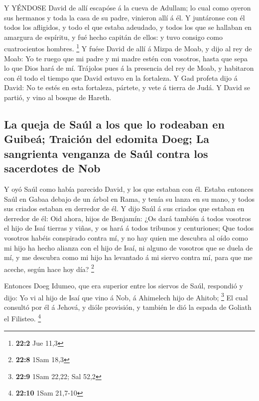  Y YÉNDOSE David de allí escapóse á la cueva de Adullam; lo
cual como oyeron sus hermanos y toda la casa de su padre, vinieron allí
á él.  Y juntáronse con él todos los afligidos, y todo el
que estaba adeudado, y todos los que se hallaban en amargura de
espíritu, y fué hecho capitán de ellos: y tuvo consigo como
cuatrocientos hombres. \footnote{\textbf{22:2} Jue 11,3}  Y
fuése David de allí á Mizpa de Moab, y dijo al rey de Moab: Yo te ruego
que mi padre y mi madre estén con vosotros, hasta que sepa lo que Dios
hará de mí.  Trájolos pues á la presencia del rey de Moab, y
habitaron con él todo el tiempo que David estuvo en la fortaleza.
 Y Gad profeta dijo á David: No te estés en esta fortaleza,
pártete, y vete á tierra de Judá. Y David se partió, y vino al bosque de
Hareth.

\hypertarget{la-queja-de-sauxfal-a-los-que-lo-rodeaban-en-guibeuxe1-traiciuxf3n-del-edomita-doeg-la-sangrienta-venganza-de-sauxfal-contra-los-sacerdotes-de-nob}{%
\subsection{La queja de Saúl a los que lo rodeaban en Guibeá; Traición
del edomita Doeg; La sangrienta venganza de Saúl contra los sacerdotes
de
Nob}\label{la-queja-de-sauxfal-a-los-que-lo-rodeaban-en-guibeuxe1-traiciuxf3n-del-edomita-doeg-la-sangrienta-venganza-de-sauxfal-contra-los-sacerdotes-de-nob}}

 Y oyó Saúl como había parecido David, y los que estaban con
él. Estaba entonces Saúl en Gabaa debajo de un árbol en Rama, y tenía su
lanza en su mano, y todos sus criados estaban en derredor de él.
 Y dijo Saúl á sus criados que estaban en derredor de él:
Oid ahora, hijos de Benjamín: ¿Os dará también á todos vosotros el hijo
de Isaí tierras y viñas, y os hará á todos tribunos y centuriones;
 Que todos vosotros habéis conspirado contra mí, y no hay
quien me descubra al oído como mi hijo ha hecho alianza con el hijo de
Isaí, ni alguno de vosotros que se duela de mí, y me descubra como mi
hijo ha levantado á mi siervo contra mí, para que me aceche, según hace
hoy día? \footnote{\textbf{22:8} 1Sam 18,3}

 Entonces Doeg Idumeo, que era superior entre los siervos de
Saúl, respondió y dijo: Yo vi al hijo de Isaí que vino á Nob, á
Ahimelech hijo de Ahitob; \footnote{\textbf{22:9} 1Sam 22,22; Sal 52,2}
 El cual consultó por él á Jehová, y dióle provisión, y
también le dió la espada de Goliath el Filisteo. \footnote{\textbf{22:10}
  1Sam 21,7-10}

